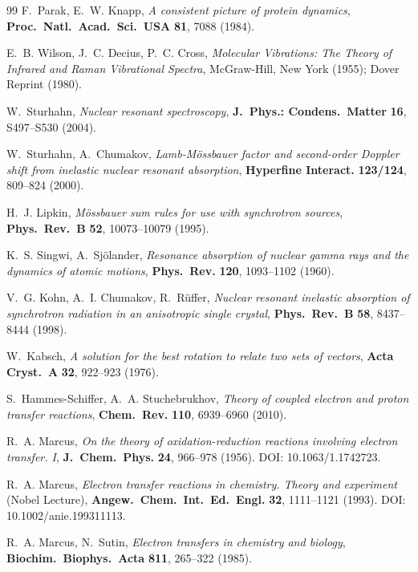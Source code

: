 \documentclass[11pt,a4paper,twoside]{article}
\theoremstyle{remark}
\begin{document}
\begin{thebibliography}{99}
F.~Parak, E.~W. Knapp,
\emph{A consistent picture of protein dynamics},
\textbf{Proc.\ Natl.\ Acad.\ Sci.\ USA} \textbf{81}, 7088 (1984).

E.~B. Wilson, J.~C. Decius, P.~C. Cross,
\emph{Molecular Vibrations: The Theory of Infrared and Raman
Vibrational Spectra},
McGraw-Hill, New York (1955); Dover Reprint (1980).

W.~Sturhahn,
\emph{Nuclear resonant spectroscopy},
\textbf{J.\ Phys.: Condens.\ Matter} \textbf{16}, S497--S530 (2004).

W.~Sturhahn, A.~Chumakov,
\emph{Lamb-M\"ossbauer factor and second-order Doppler shift from
inelastic nuclear resonant absorption},
\textbf{Hyperfine Interact.} \textbf{123/124}, 809--824 (2000).

H.~J. Lipkin,
\emph{M\"ossbauer sum rules for use with synchrotron sources},
\textbf{Phys.\ Rev.\ B} \textbf{52}, 10073--10079 (1995).

K.~S. Singwi, A.~Sj\"olander,
\emph{Resonance absorption of nuclear gamma rays and the dynamics of
atomic motions},
\textbf{Phys.\ Rev.} \textbf{120}, 1093--1102 (1960).

V.~G. Kohn, A.~I. Chumakov, R.~R\"uffer,
\emph{Nuclear resonant inelastic absorption of synchrotron radiation
in an anisotropic single crystal},
\textbf{Phys.\ Rev.\ B} \textbf{58}, 8437--8444 (1998).

W.~Kabsch,
\emph{A solution for the best rotation to relate two sets of vectors},
\textbf{Acta Cryst.\ A} \textbf{32}, 922--923 (1976).

S.~Hammes-Schiffer, A.~A. Stuchebrukhov,
\emph{Theory of coupled electron and proton transfer reactions},
\textbf{Chem.\ Rev.} \textbf{110}, 6939--6960 (2010).

R.~A. Marcus,
\emph{On the theory of oxidation-reduction reactions involving
electron transfer. I},
\textbf{J.\ Chem.\ Phys.} \textbf{24}, 966--978 (1956).
DOI: 10.1063/1.1742723.

R.~A. Marcus,
\emph{Electron transfer reactions in chemistry. Theory and experiment}
(Nobel Lecture),
\textbf{Angew.\ Chem.\ Int.\ Ed.\ Engl.} \textbf{32}, 1111--1121 (1993).
DOI: 10.1002/anie.199311113.

R.~A. Marcus, N.~Sutin,
\emph{Electron transfers in chemistry and biology},
\textbf{Biochim.\ Biophys.\ Acta} \textbf{811}, 265--322 (1985).


\end{thebibliography}
\end{document}
